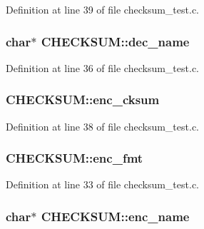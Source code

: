 Definition at line 39 of file checksum\+\_\+test.\+c.

\subsubsection[{\texorpdfstring{dec\+\_\+name}{dec_name}}]{ char$\ast$ C\+H\+E\+C\+K\+S\+U\+M\+::dec\+\_\+name}\hypertarget{struct_c_h_e_c_k_s_u_m_aa9c189190387894627e0d0a6f800d999}{}\label{struct_c_h_e_c_k_s_u_m_aa9c189190387894627e0d0a6f800d999}


Definition at line 36 of file checksum\+\_\+test.\+c.

\subsubsection[{\texorpdfstring{enc\+\_\+cksum}{enc_cksum}}]{ C\+H\+E\+C\+K\+S\+U\+M\+::enc\+\_\+cksum}\hypertarget{struct_c_h_e_c_k_s_u_m_afcce1468397dd13b5b4e9a8e885acd42}{}\label{struct_c_h_e_c_k_s_u_m_afcce1468397dd13b5b4e9a8e885acd42}


Definition at line 38 of file checksum\+\_\+test.\+c.

\subsubsection[{\texorpdfstring{enc\+\_\+fmt}{enc_fmt}}]{ C\+H\+E\+C\+K\+S\+U\+M\+::enc\+\_\+fmt}\hypertarget{struct_c_h_e_c_k_s_u_m_a5a1e0029264a9d26d230ffcd49545f38}{}\label{struct_c_h_e_c_k_s_u_m_a5a1e0029264a9d26d230ffcd49545f38}


Definition at line 33 of file checksum\+\_\+test.\+c.

\subsubsection[{\texorpdfstring{enc\+\_\+name}{enc_name}}]{ char$\ast$ C\+H\+E\+C\+K\+S\+U\+M\+::enc\+\_\+name}\hypertarget{struct_c_h_e_c_k_s_u_m_a2b93fe60a36254958b688cf4a44c71d7}{}\label{struct_c_h_e_c_k_s_u_m_a2b93fe60a36254958b688cf4a44c71d7}


